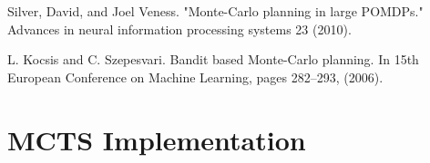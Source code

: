 \documentclass[a4paper,10pt]{article}
\begin{document}

\begin{thebibliography}{9}
	Silver, David, and Joel Veness. "Monte-Carlo planning in large POMDPs." Advances in neural information processing systems 23 (2010).
	
	L. Kocsis and C. Szepesvari. Bandit based Monte-Carlo planning. In 15th European
	Conference on Machine Learning, pages 282–293, (2006).
	
\end{thebibliography}

\newpage
\appendix
\section{MCTS Implementation}
\label{app:mcts}
\end{document}

